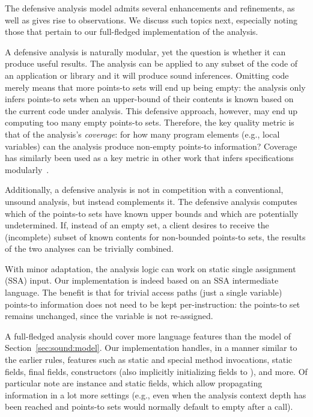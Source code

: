 The defensive analysis model admits several enhancements and refinements, as well as gives rise to observations. We discuss such topics next, especially noting those that pertain to our full-fledged implementation of the analysis.


A defensive analysis is naturally modular, yet the question is whether it can produce useful results. The analysis can be applied to any subset of the code of an application or library and it will produce sound inferences. Omitting code merely means that more points-to sets will end up being empty: the analysis only infers points-to sets when an upper-bound of their contents is known based on the current code under analysis. This defensive approach, however, may end up computing too many empty points-to sets. Therefore, the key quality metric is that of the analysis's \emph{coverage}: for how many program elements (e.g., local variables) can the analysis produce non-empty points-to information? Coverage has similarly been used as a key metric in other work that infers specifications modularly~\cite{popl:2009:Calcagno}.

Additionally, a defensive analysis is not in competition with a conventional, unsound analysis, but instead complements it. The defensive analysis computes which of the points-to sets have known upper bounds and which are potentially undetermined. If, instead of an empty set, a client desires to receive the (incomplete) subset of known contents for non-bounded points-to sets, the results of the two analyses can be trivially combined.


With minor adaptation, the analysis logic can work on static single assignment (SSA) input.  Our implementation is indeed based on an SSA intermediate language. The benefit is that for trivial access paths (just a single variable) points-to information does not need to be kept per-instruction: the points-to set remains unchanged, since the variable is not re-assigned.

A full-fledged analysis should cover more language features than the model of Section~\ref{sec:sound:model}. Our implementation handles, in a manner similar to the earlier rules, features such as static and special method invocations, static fields, final fields, constructors (also implicitly initializing fields to ), and more. Of particular note are  instance and static fields, which allow propagating information in a lot more settings (e.g., even when the analysis context depth has been reached and points-to sets would normally default to empty after a call).


